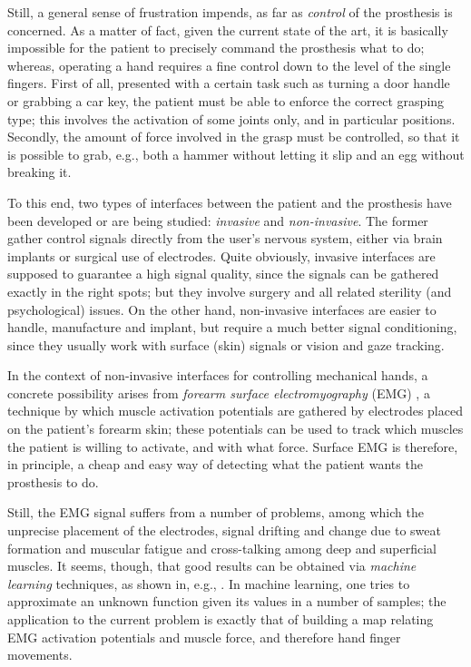 Still, a general sense of frustration impends, as far as
\emph{control} of the prosthesis is concerned. As a matter of fact,
given the current state of the art, it is basically impossible for the
patient to precisely command the prosthesis what to do; whereas,
operating a hand requires a fine control down to the level of the
single fingers. First of all, presented with a certain task such as
turning a door handle or grabbing a car key, the patient must be able
to enforce the correct grasping type; this involves the activation of
some joints only, and in particular positions. Secondly, the amount of
force involved in the grasp must be controlled, so that it is possible
to grab, e.g., both a hammer without letting it slip and an egg
without breaking it.

To this end, two types of interfaces between the patient and the
prosthesis have been developed or are being studied: \emph{invasive}
and \emph{non-invasive}. The former gather control signals directly
from the user's nervous system, either via brain implants or surgical
use of electrodes. Quite obviously, invasive interfaces are supposed
to guarantee a high signal quality, since the signals can be gathered
exactly in the right spots; but they involve surgery and all related
sterility (and psychological) issues. On the other hand, non-invasive
interfaces are easier to handle, manufacture and implant, but require
a much better signal conditioning, since they usually work with
surface (skin) signals or vision and gaze tracking.

In the context of non-invasive interfaces for controlling mechanical
hands, a concrete possibility arises from \emph{forearm surface
electromyography} (EMG) \cite{zecca}, a technique by which muscle
activation potentials are gathered by electrodes placed on the
patient's forearm skin; these potentials can be used to track which
muscles the patient is willing to activate, and with what force.
Surface EMG is therefore, in principle, a cheap and easy way of
detecting what the patient wants the prosthesis to do.

Still, the EMG signal suffers from a number of problems, among which
the unprecise placement of the electrodes, signal drifting and change
due to sweat formation and muscular fatigue and cross-talking among
deep and superficial muscles. It seems, though, that good results can
be obtained via \emph{machine learning} techniques, as shown in, e.g.,
\cite{smagt}. In machine learning, one tries to approximate an unknown
function given its values in a number of samples; the application to
the current problem is exactly that of building a map relating EMG
activation potentials and muscle force, and therefore hand finger
movements.

